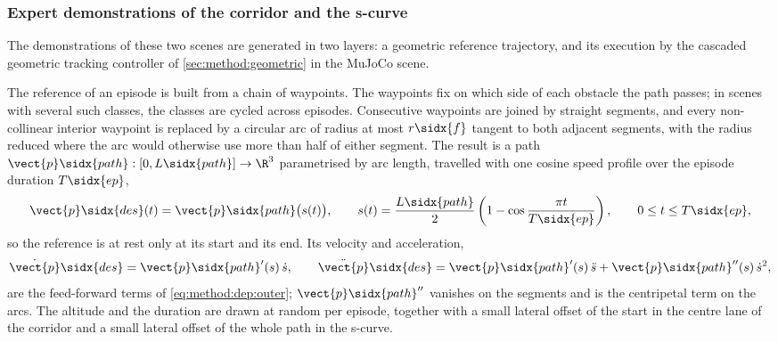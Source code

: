 \subsubsection*{Expert demonstrations of the corridor and the s-curve}

The demonstrations of these two scenes are generated in two layers: a geometric reference trajectory,
and its execution by the cascaded geometric tracking controller of \autoref{sec:method:geometric} in the
MuJoCo scene.

The reference of an episode is built from a chain of waypoints. The waypoints fix on which side of each
obstacle the path passes; in scenes with several such classes, the classes are cycled across episodes.
Consecutive waypoints are joined by straight segments, and every non-collinear interior waypoint is
replaced by a circular arc of radius at most $r\sidx{f}$ tangent to both adjacent segments, with the
radius reduced where the arc would otherwise use more than half of either segment. The result is a
path $\vect{p}\sidx{path}:[0,L\sidx{path}]\to\R^{3}$ parametrised by arc length, travelled with one cosine
speed profile over the episode duration $T\sidx{ep}$,
\begin{equation}\label{eq:method:env:uavref}
  \vect{p}\sidx{des}(t) = \vect{p}\sidx{path}\big(s(t)\big),
  \qquad
  s(t) = \frac{L\sidx{path}}{2}\left(1-\cos\frac{\pi t}{T\sidx{ep}}\right),
  \qquad 0\le t\le T\sidx{ep},
\end{equation}
so the reference is at rest only at its start and its end. Its velocity and acceleration,
\begin{equation}\label{eq:method:env:uavrefderiv}
  \dot{\vect{p}}\sidx{des} = \vect{p}\sidx{path}'(s)\,\dot{s},
  \qquad
  \ddot{\vect{p}}\sidx{des} = \vect{p}\sidx{path}'(s)\,\ddot{s} + \vect{p}\sidx{path}''(s)\,\dot{s}^{2},
\end{equation}
are the feed-forward terms of \eqref{eq:method:dep:outer}; $\vect{p}\sidx{path}''$ vanishes on the segments
and is the centripetal term on the arcs. The altitude and the duration are drawn at random per
episode, together with a small lateral offset of the start in the centre lane of the corridor and a
small lateral offset of the whole path in the s-curve.

